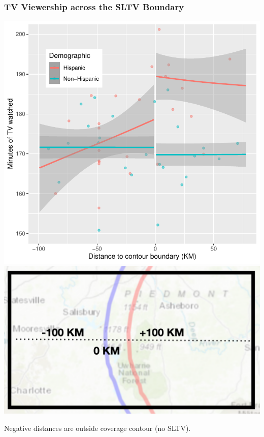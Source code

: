 \documentclass{beamer}
\begin{document}
\begin{frame}
\frametitle{TV Viewership across the SLTV Boundary} \label{atus_time}

\begin{center}
\includegraphics[width=.75\textwidth]{../../analysis/Output/graphs/atus2.pdf}
\includegraphics[width=.24\textwidth]{figs/contour_describer}\\
\end{center}
\vspace{-5pt}
\footnotesize Negative distances are outside coverage contour (no SLTV). \hyperlink{atus_breakdown}{}


\end{frame}
\end{document}
